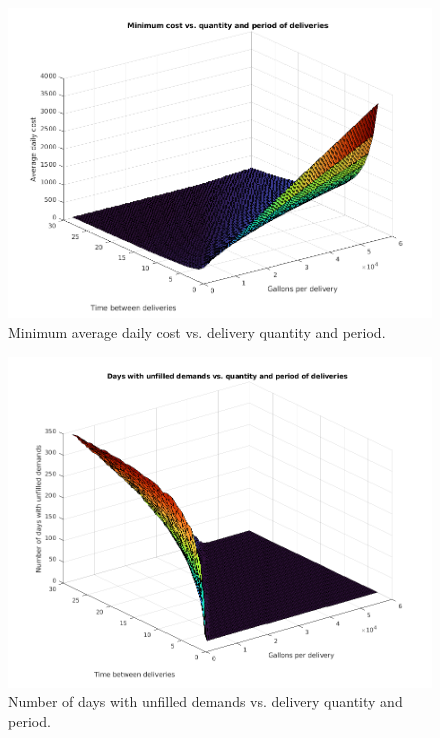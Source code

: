 \documentclass{article}
\begin{document}
    \begin{figure}[h]
        \centering
        \includegraphics[width=\textwidth]{img/surface1.png}
        \caption{Minimum average daily cost vs. delivery quantity and period.}
        \label{fig:surface1}
    \end{figure}

    \begin{figure}[p]
        \centering
        \includegraphics[width=\textwidth]{img/surface2.png}
        \caption{Number of days with unfilled demands vs. delivery quantity and period.}
        \label{fig:surface2}
    \end{figure}
\end{document}
